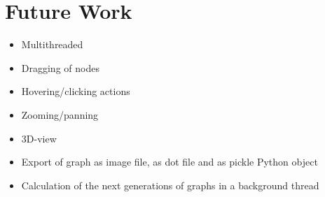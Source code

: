
\chapter{Future Work}

\begin{itemize}
	\item Multithreaded
	\item Dragging of nodes
	\item Hovering/clicking actions
	\item Zooming/panning
	\item 3D-view
	\item Export of graph as image file, as dot file and as pickle Python object
	\item Calculation of the next generations of graphs in a background thread

\end{itemize}